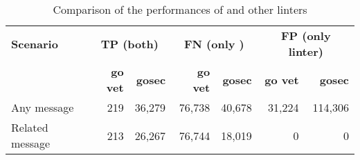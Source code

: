 \begin{table}[htp!]
    \centering
    \caption{Comparison of the performances of \toolGeiger{} and other linters}
    \label{tbl:go-geiger-evaluation-linters}
    \begin{tabular}{l|rr|rr|rr}
        \textbf{Scenario} & \multicolumn{2}{c|}{\textbf{TP (both)}} & \multicolumn{2}{c|}{\textbf{FN (only \toolGeiger{})}} & \multicolumn{2}{c}{\textbf{FP (only linter)}} \\
        {}                & \textbf{go vet} & \textbf{gosec}        & \textbf{go vet} & \textbf{gosec}                      & \textbf{go vet} & \textbf{gosec}              \\
        \hline
        Any message       & 219             & 36,279                & 76,738          & 40,678                              &  31,224         & 114,306                     \\
        Related message   & 213             & 26,267                & 76,744          & 18,019                              &       0         & 0                           \\
    \end{tabular}
\end{table}
